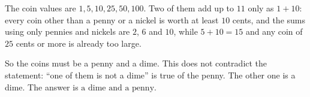 The coin values are $1,5,10,25,50,100$. Two of them add up to $11$ only as $1+10$: every coin other than a penny or a nickel is worth at least $10$ cents, and the sums using only pennies and nickels are $2$, $6$ and $10$, while $5+10=15$ and any coin of $25$ cents or more is already too large.

So the coins must be a penny and a dime. This does not contradict the statement: ``one of them is not a dime'' is true of the penny. The other one is a dime. The answer is $\boxed{\text{a dime and a penny}}$.
